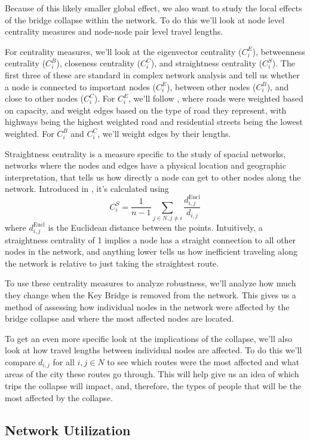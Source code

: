 \documentclass[11pt]{article}
\numberwithin{equation}{section} %
\numberwithin{figure}{section} %
\numberwithin{table}{section} %
\theoremstyle{definition}
\begin{document}
Because of this likely smaller global effect, we also want to study the local effects of the bridge collapse within the network. To do this we'll look at node level centrality measures and node-node pair level travel lengths.

For centrality measures, we'll look at the eigenvector centrality ($C^E_i$), betweenness centrality ($C^B_i$), closeness centrality ($C^C_i$), and straightness centrality ($C^S_i$). The first three of these are standard in complex network analysis and tell us whether a node is connected to important nodes ($C^E_i$), between other nodes ($C^B_i$), and close to other nodes ($C^C_i$). For $C_i^E$, we'll follow \cite{Ando20}, where roads were weighted based on capacity, and weight edges based on the type of road they represent, with highways being the highest weighted road and residential streets being the lowest weighted. For $C^B_i$ and $C^C_i$, we'll weight edges by their lengths.

Straightness centrality is a measure specific to the study of spacial networks, networks where the nodes and edges have a physical location and geographic interpretation, that tells us how directly a node can get to other nodes along the network. Introduced in \cite{Porta06}, it's calculated using 
\[
  C_i^S = \frac{1}{n-1} \sum_{j \in N, j \neq i} \frac{d_{i, j}^\text{Eucl}}{d_{i, j}}
\]
where $d_{i, j}^\text{Eucl}$ is the Euclidean distance between the points. Intuitively, a straightness centrality of 1 implies a node has a straight connection to all other nodes in the network, and anything lower tells us how inefficient traveling along the network is relative to just taking the straightest route.

To use these centrality measures to analyze robustness, we'll analyze how much they change when the Key Bridge is removed from the network. This gives us a method of assessing how individual nodes in the network were affected by the bridge collapse and where the most affected nodes are located.

To get an even more specific look at the implications of the collapse, we'll also look at how travel lengths between individual nodes are affected. To do this we'll compare $d_{i, j}$ for all $i, j \in N$ to see which routes were the most affected and what areas of the city these routes go through. This will help give us an idea of which trips the collapse will impact, and, therefore, the types of people that will be the most affected by the collapse.


\subsection{Network Utilization}
\end{document}
